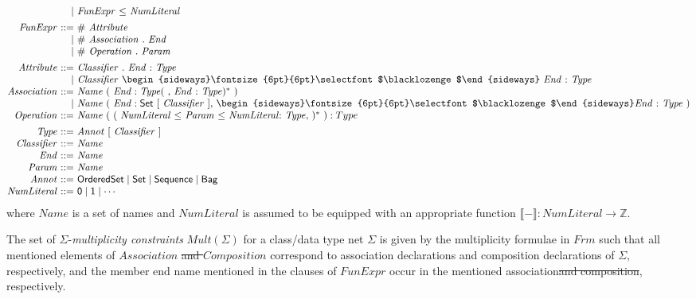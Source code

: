 \documentclass[10pt,fleqn,final]{scrreprt}
\newenvironment{definitions}[0]{\medskip }{}
\newcommand{\composition}{\raisebox{0.2pt}{\begin{sideways}\fontsize{6pt}{6pt}\selectfont$\blacklozenge$\end{sideways}}}
\newcommand{\NZ}{\mathbb{Z}}
\newcommand{\sem}[1]{\mathopen\llbracket#1\mathclose\rrbracket}
\providecommand{\DIFdel}[1]{{\protect\color{red}\sout{#1}}}                      %
\providecommand{\DIFaddend}{} %
\providecommand{\DIFdelbegin}{} %
\providecommand{\DIFdelend}{} %
\begin{document}
\begin{definitions}
\begin{equation*}
{\begin{array}{@{}r@{\ }r@{\ }l@{}}
               &   | & \mathit{FunExpr}\ \mathsf{\leq}\ \mathit{NumLiteral}
\\[1ex]
  \mathit{FunExpr} & ::= & \mathit{\#}\ \mathit{Attribute}\\
                   &   | & \mathit{\#}\ \mathit{Association}\ \mathsf{.}\ \mathit{End}\\
                   &   | & \mathit{\#}\ \mathit{Operation}\ \mathsf{.}\ \mathit{Param}
\\[1ex]
  \mathit{Attribute} & ::= & \mathit{Classifier}\ \mathsf{.}\ \mathit{End}\ \mathsf{:}\ \mathit{Type}\\
                     &   | & \mathit{Classifier}\ \composition\ \mathit{End}\ \mathsf{:}\ \mathit{Type}
\\
  \mathit{Association} & ::= & \mathit{Name}\ (\ \mathit{End} : \mathit{Type}(\ \mathsf{,}\ \mathit{End}\ \mathsf{:}\ \mathit{Type})^*\ )\\
                       &   | & \mathit{Name}\ (\ \mathit{End} : \mathsf{Set}\ [\ \mathit{Classifier}\ ]\mathsf{,}\ \composition \mathit{End}\ \mathsf{:}\ \mathit{Type}\ )
\\
  \mathit{Operation} & ::= & \mathit{Name}\ (\  (\  \mathit{NumLiteral}\ \mathsf{\leq}\ \mathit{Param}\  \mathsf{\leq}\ \mathit{NumLiteral} \mathsf{:}\ \mathit{Type} \mathsf{,}\ )^*\ ) : Type
\\[1ex]
  \mathit{Type} & ::= & \mathit{Annot}\ \mathsf{[}\ \mathit{Classifier}\ \mathsf{]}
\\
  \mathit{Classifier} & ::= & \mathit{Name}
\\
  \mathit{End} & ::= & \mathit{Name}
\\
  \mathit{Param} & ::= & \mathit{Name}
\\
  \mathit{Annot} & ::= & \mathsf{OrderedSet} \mid \mathsf{Set} \mid \mathsf{Sequence} \mid \mathsf{Bag}
\\
  \mathit{NumLiteral} & ::= & \mathsf{0} \mid \mathsf{1} \mid \cdots
\end{array}
}\DIFaddend \end{equation*}
%
where $\mathit{Name}$ is a set of names and $\mathit{NumLiteral}$ is
assumed to be equipped with an appropriate function
$\sem{-} : \mathit{NumLiteral} \to \NZ$.

The set of $\Sigma$-\emph{multiplicity
  constraints} $\mathit{Mult}(\Sigma)$
for a class/data type net $\Sigma$
is given by the multiplicity formulae in $\mathit{Frm}$
such that all mentioned elements of $\mathit{Association}$
\DIFdelbegin \DIFdel{and $\mathit{Composition}$ }\DIFdelend correspond to association declarations and composition declarations of
$\Sigma$,
respectively, and the member end name mentioned in the clauses of
$\mathit{FunExpr}$ occur in the mentioned association\DIFdelbegin \DIFdel{and composition}\DIFdelend , respectively.


\end{definitions}
\end{document}
